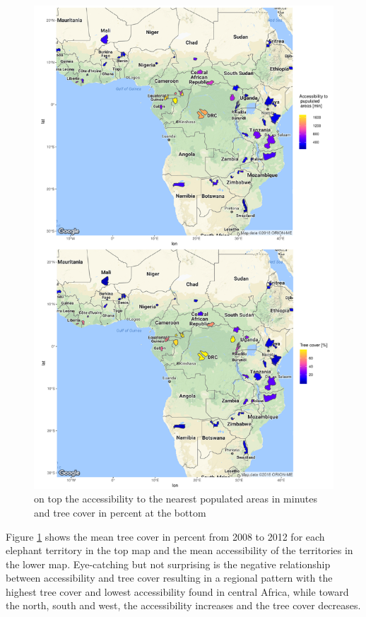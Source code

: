 \begin{center}
	\begin{figure}[H]
		\begin{center}
			\includegraphics[width=14cm]{images/sample_session_1-cropped.pdf}
			\caption{on top the accessibility to the nearest populated areas in minutes and tree cover in percent at the bottom}
			\label{sample_session_1}
		\end{center}
	\end{figure}
\end{center}


Figure \ref{sample_session_1} shows the mean tree cover in percent from 2008 to 2012 for each elephant territory in the top map and the mean accessibility of the territories in the lower map. Eye-catching but not surprising is the negative relationship between accessibility and tree cover resulting in a regional pattern with the highest tree cover and lowest accessibility found in central Africa, while toward the north, south and west, the accessibility increases and the tree cover decreases.

